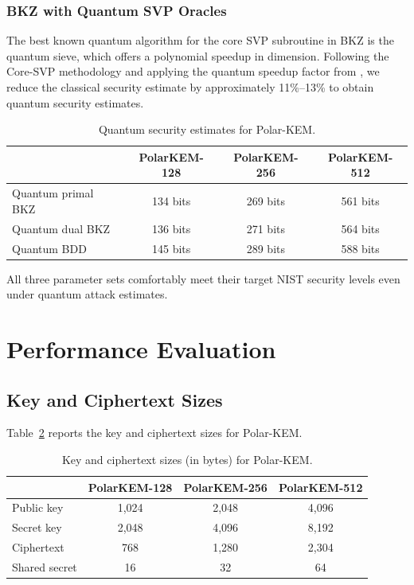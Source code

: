 \documentclass[11pt,a4paper]{article}
\newcommand{\polarKem}{\textsf{Polar-KEM}\xspace}
\begin{document}
\subsubsection{BKZ with Quantum SVP Oracles}

The best known quantum algorithm for the core SVP subroutine in BKZ is the quantum sieve, which offers a polynomial speedup in dimension. Following the Core-SVP methodology and applying the quantum speedup factor from \cite{LRBN2022quantum}, we reduce the classical security estimate by approximately 11\%--13\% to obtain quantum security estimates.

\begin{table}[H]
\centering
\caption{Quantum security estimates for \polarKem.}
\label{tab:quantum}
\begin{tabular}{@{}lccc@{}}
\toprule
 & \textbf{PolarKEM-128} & \textbf{PolarKEM-256} & \textbf{PolarKEM-512} \\
\midrule
Quantum primal BKZ & 134 bits & 269 bits & 561 bits \\
Quantum dual BKZ & 136 bits & 271 bits & 564 bits \\
Quantum BDD & 145 bits & 289 bits & 588 bits \\
\bottomrule
\end{tabular}
\end{table}

All three parameter sets comfortably meet their target NIST security levels even under quantum attack estimates.

\section{Performance Evaluation}\label{sec:performance}

\subsection{Key and Ciphertext Sizes}\label{sec:sizes}

Table~\ref{tab:sizes} reports the key and ciphertext sizes for \polarKem.

\begin{table}[H]
\centering
\caption{Key and ciphertext sizes (in bytes) for \polarKem.}
\label{tab:sizes}
\begin{tabular}{@{}lccc@{}}
\toprule
 & \textbf{PolarKEM-128} & \textbf{PolarKEM-256} & \textbf{PolarKEM-512} \\
\midrule
Public key & 1,024 & 2,048 & 4,096 \\
Secret key & 2,048 & 4,096 & 8,192 \\
Ciphertext & 768 & 1,280 & 2,304 \\
Shared secret & 16 & 32 & 64 \\
\bottomrule
\end{tabular}
\end{table}
\end{document}

